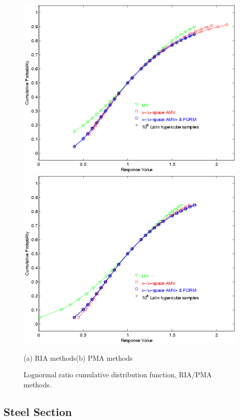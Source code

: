 \begin{figure}[hbp]
\centering
\centerline{\includegraphics[scale=0.5]{images/log_ratio_cdf_ria}
            \includegraphics[scale=0.5]{images/log_ratio_cdf_pma}}
(a) RIA methods\hspace{2.5in}(b) PMA methods
\caption{Lognormal ratio cumulative distribution function, RIA/PMA methods.}
\label{fig:log_ratio_cdf}
\end{figure}

\subsection{Steel Section}\label{additional:steel_section}

